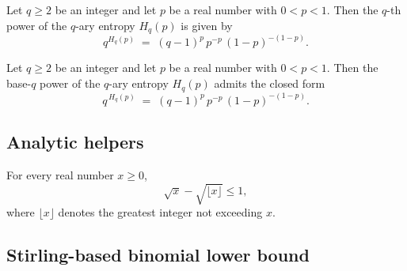 \begin{lemma}
\label{ErrorCorrectingCodes.Codeword.q_pow_qary_entropy_simp}
\leanok
{}
Let $q \ge 2$ be an integer and let $p$ be a real number with $0 < p < 1$. Then the
$q$-th power of the $q$-ary entropy $H_q(p)$ is given by
\[
q^{H_q(p)} \;=\; (q-1)^{p}\, p^{-p}\, (1-p)^{-(1-p)}.
\]
\end{lemma}

\begin{lemma}
\label{ErrorCorrectingCodes.Codeword.q_pow_qary_entropy_simp'}
\leanok
{}
Let $q \ge 2$ be an integer and let $p$ be a real number with $0 < p < 1$. Then the
base-$q$ power of the $q$-ary entropy $H_q(p)$ admits the closed form
\[
q^{\,H_q(p)} \;=\; (q-1)^{p}\, p^{-p}\,(1-p)^{-(1-p)}.
\]
\end{lemma}

\subsection{Analytic helpers}

\begin{lemma}
\label{ErrorCorrectingCodes.Codeword.sqrt_sub_sqrt_floor_le_one}
\leanok
{}
For every real number $x \ge 0$,
\[
\sqrt{x} - \sqrt{\lfloor x \rfloor} \le 1,
\]
where $\lfloor x \rfloor$ denotes the greatest integer not exceeding $x$.
\end{lemma}

\subsection{Stirling-based binomial lower bound}

